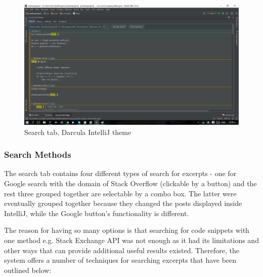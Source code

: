 \documentclass{l4proj}
\begin{document}
\begin{figure}[H]
\includegraphics[scale=0.5]{tab-search}
\centering
\caption{Search tab, Darcula IntelliJ theme}
\label{fig:search-tab}
\end{figure}

\subsubsection{Search Methods}
The search tab contains four different types of search for excerpts - one for Google search with the domain of Stack Overflow (clickable by a button) and the rest three grouped together are selectable by a combo box. The latter were eventually grouped together because they changed the posts displayed inside IntelliJ, while the Google button's functionality is different.

\noindent
The reason for having so many options is that searching for code snippets with one method e.g. Stack Exchange API was not enough as it had its limitations and other ways that can provide additional useful results existed. Therefore, the system offers a number of techniques for searching excerpts that have been outlined below:
\end{document}
